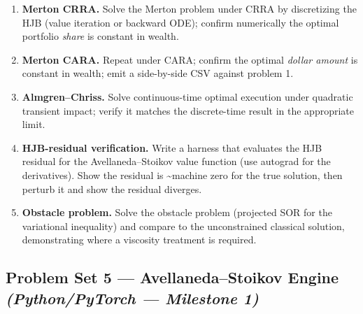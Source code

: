 \documentclass[
]{article}
\providecommand{\tightlist}{%
  \setlength{\itemsep}{0pt}\setlength{\parskip}{0pt}}
\begin{document}
\begin{enumerate}
\def\labelenumi{\arabic{enumi}.}
\tightlist
\item
  \textbf{Merton CRRA.} Solve the Merton problem under CRRA by
  discretizing the HJB (value iteration or backward ODE); confirm
  numerically the optimal portfolio \emph{share} is constant in wealth.
\item
  \textbf{Merton CARA.} Repeat under CARA; confirm the optimal
  \emph{dollar amount} is constant in wealth; emit a side-by-side CSV
  against problem 1.
\item
  \textbf{Almgren--Chriss.} Solve continuous-time optimal execution
  under quadratic transient impact; verify it matches the discrete-time
  result in the appropriate limit.
\item
  \textbf{HJB-residual verification.} Write a harness that evaluates the
  HJB residual for the Avellaneda--Stoikov value function (use autograd
  for the derivatives). Show the residual is \textasciitilde machine
  zero for the true solution, then perturb it and show the residual
  diverges.
\item
  \textbf{Obstacle problem.} Solve the obstacle problem (projected SOR
  for the variational inequality) and compare to the unconstrained
  classical solution, demonstrating where a viscosity treatment is
  required.
\end{enumerate}

\subsection{\texorpdfstring{Problem Set 5 --- Avellaneda--Stoikov Engine
\emph{(Python/PyTorch --- Milestone
1)}}{Problem Set 5 --- Avellaneda--Stoikov Engine (Python/PyTorch --- Milestone 1)}}\label{problem-set-5-avellanedastoikov-engine-pythonpytorch-milestone-1}
\end{document}
